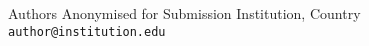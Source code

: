 \oneauthor
{Authors Anonymised for Submission}
{Institution, Country \\ {\tt author@institution.edu}}

